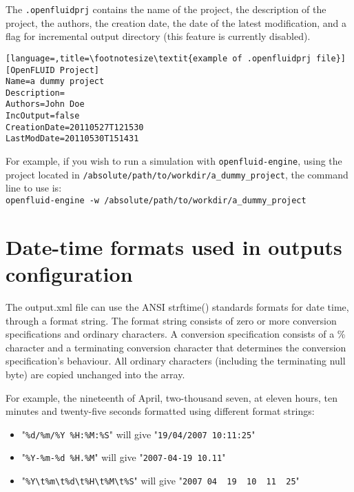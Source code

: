 The \texttt{.openfluidprj} contains the name of the project, the description of the project, the authors,
the creation date, the date of the latest modification, and a flag for
incremental output directory (this feature is currently disabled). 

\begin{lstlisting}[language=,title=\footnotesize\textit{example of .openfluidprj file}]
[OpenFLUID Project]
Name=a dummy project
Description=
Authors=John Doe
IncOutput=false
CreationDate=20110527T121530
LastModDate=20110530T151431
\end{lstlisting}

\medskip

For example, if you wish to run a simulation with \texttt{openfluid-engine}, using the project located in
\texttt{/absolute/path/to/workdir/a\_dummy\_project}, the command line to use is:\\
\texttt{openfluid-engine -w /absolute/path/to/workdir/a\_dummy\_project}\\

\medskip


\section{Date-time formats used in outputs configuration}

The output.xml file can use the ANSI strftime() standards formats for date time, through a format string. 
The format string consists of zero or more conversion specifications and ordinary characters.
A conversion specification consists of a \% character and a terminating conversion character that determines the conversion specification's behaviour.
All ordinary characters (including the terminating null byte) are copied unchanged into the array.

\bigskip

For example, the nineteenth of April, two-thousand seven, at eleven hours, ten minutes and twenty-five seconds formatted using different format strings:
\begin{itemize}
\item "\verb|%d/%m/%Y %H:%M:%S|" will give "\verb|19/04/2007 10:11:25|"
\item "\verb|%Y-%m-%d %H.%M|" will give "\verb|2007-04-19 10.11|"
\item "\verb|%Y\t%m\t%d\t%H\t%M\t%S|" will give "\verb|2007 04  19  10  11  25|"
\end{itemize}

